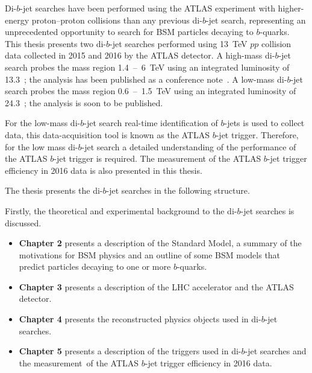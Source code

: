 Di-$b$-jet searches have been performed using the ATLAS experiment
with higher-energy proton--proton collisions than any previous \mbox{di-$b$-jet} search,
representing an unprecedented opportunity to search for BSM particles decaying to $b$-quarks.
This thesis presents two di-$b$-jet searches performed using
13~TeV $pp$ collision data collected in 2015 and 2016 by the ATLAS detector.
A high-mass di-$b$-jet search probes the mass region 1.4~--~6~TeV using an integrated luminosity of 13.3~\ifb{};
the analysis has been published as a conference note~\cite{dibjet-ichep_conf}.
A low-mass di-$b$-jet search probes the mass region 0.6~--~1.5~TeV using an integrated luminosity of 24.3~\ifb{};
the analysis is soon to be published.

For the low-mass di-$b$-jet search real-time identification of $b$-jets is used to collect data,
this data-acquisition tool is known as the ATLAS $b$-jet trigger.
Therefore, for the low mass di-$b$-jet search a detailed understanding of the performance of the ATLAS $b$-jet trigger is required.
The measurement of the ATLAS $b$-jet trigger efficiency in 2016 data is also presented in this thesis.

%
\noindent
The thesis presents the di-$b$-jet searches in the following structure.\vspace{-0.5em}

\noindent
Firstly, the theoretical and experimental background to the di-$b$-jet searches is discussed.
\vspace{-0.5em}
\begin{itemize}[leftmargin=*]
\item\textbf{Chapter 2} presents a description of the Standard Model,
  a summary of the motivations for BSM physics and
  an outline of some BSM models that predict particles
  decaying to one or more $b$-quarks.%
\item\textbf{Chapter 3} presents a description of the LHC accelerator and the ATLAS detector.%
\item\textbf{Chapter 4} presents the reconstructed physics objects used in di-$b$-jet searches. %
\item\textbf{Chapter 5} presents a description of the triggers used in di-$b$-jet searches
  and the measurement~of the ATLAS $b$-jet trigger efficiency in 2016 data. %
\end{itemize}

